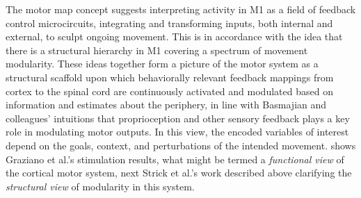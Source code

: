 \documentclass[../main.tex]{subfiles}
\begin{document}
The motor map concept suggests interpreting activity in M1 as a field of feedback control microcircuits, integrating and transforming inputs, both internal and external, to sculpt ongoing movement\cite{wiltschkoMappingSubSecondStructure2015}. This is in accordance with the idea that there is a structural hierarchy in M1 covering a spectrum of movement modularity. These ideas together form a picture of the motor system as a structural scaffold upon which behaviorally relevant feedback mappings from cortex to the spinal cord are continuously activated and modulated based on information and estimates about the periphery, in line with Basmajian and colleagues' intuitions that proprioception and other sensory feedback plays a key role in modulating motor outputs. In this view, the encoded variables of interest depend on the goals, context, and perturbations of the intended movement.  shows Graziano et al.'s stimulation results, what might be termed a \textit{functional view} of the cortical motor system, next Strick et al.'s work described above clarifying the \textit{structural view} of modularity in this system.
\end{document}
